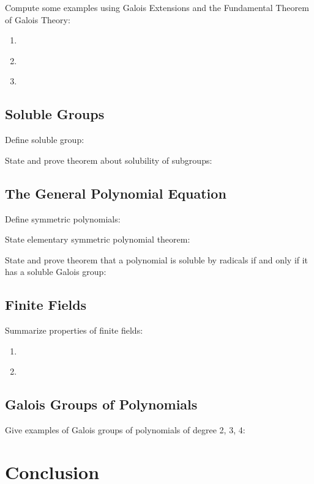 \documentclass[11pt, a4paper, oneside]{article}
\theoremstyle{plain}
\theoremstyle{definition}
\theoremstyle{example}
\begin{document}
Compute some examples using Galois Extensions and the Fundamental Theorem of Galois Theory:
\begin{enumerate}
\item \cite[Sec. 14.2]{dummit}
\item \cite[Ch. 9]{juliusz}
\item \cite[Ch. 13]{stewart}
\end{enumerate} 

\subsection{Soluble Groups}

Define soluble group: \cite[Sec. 14.1]{stewart}

State and prove theorem about solubility of subgroups: \cite[Sec. 14.1]{stewart}

\subsection{The General Polynomial Equation}

Define symmetric polynomials: \cite[Sec. 18.2]{stewart}

State elementary symmetric polynomial theorem: \cite[18.2]{stewart}

State and prove theorem that a polynomial is soluble by radicals if and only if it has a soluble Galois group: \cite[18.4]{stewart}

\subsection{Finite Fields}

Summarize properties of finite fields:
\begin{enumerate}
\item \cite[Sec. 14.3]{dummit}
\item \cite[Ch. 19]{stewart}
\end{enumerate}

\subsection{Galois Groups of Polynomials}

Give examples of Galois groups of polynomials of degree 2, 3, 4: \cite[Sec. 14.6]{dummit}

\newpage
\section{Conclusion}
\end{document}
